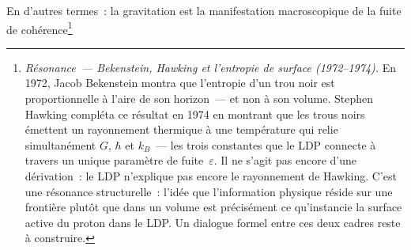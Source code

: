 \documentclass[12pt, a4paper, openright]{book}
\begin{document}
\medskip

En d'autres termes~: la gravitation est la manifestation macroscopique de la fuite de cohérence\footnote{\textit{Résonance~--- Bekenstein, Hawking et l'entropie de surface (1972--1974).} En 1972, Jacob Bekenstein montra que l'entropie d'un trou noir est proportionnelle à l'aire de son horizon~--- et non à son volume. Stephen Hawking compléta ce résultat en 1974 en montrant que les trous noirs émettent un rayonnement thermique à une température qui relie simultanément $G$, $\hbar$ et $k_B$~--- les trois constantes que le LDP connecte à travers un unique paramètre de fuite~$\varepsilon$. Il ne s'agit pas encore d'une dérivation~: le LDP n'explique pas encore le rayonnement de Hawking. C'est une résonance structurelle~: l'idée que l'information physique réside sur une frontière plutôt que dans un volume est précisément ce qu'instancie la surface active du proton dans le LDP\@. Un dialogue formel entre ces deux cadres reste à construire.}
\end{document}
